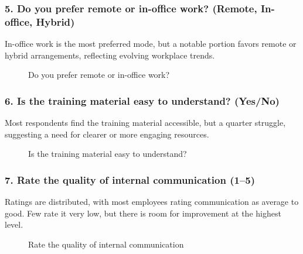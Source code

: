 \subsubsection*{5. Do you prefer remote or in-office work? (Remote, In-office, Hybrid)}

In-office work is the most preferred mode, but a notable portion favors remote or hybrid arrangements, reflecting evolving workplace trends.

\begin{figure}[H]
    \centering
    \caption{Do you prefer remote or in-office work?}
    \label{fig:work_pref}
\end{figure}

\subsubsection*{6. Is the training material easy to understand? (Yes/No)}

Most respondents find the training material accessible, but a quarter struggle, suggesting a need for clearer or more engaging resources.

\begin{figure}[H]
    \centering
    \caption{Is the training material easy to understand?}
    \label{fig:training_easy}
\end{figure}

\subsubsection*{7. Rate the quality of internal communication (1--5)}

Ratings are distributed, with most employees rating communication as average to good. Few rate it very low, but there is room for improvement at the highest level.

\begin{figure}[H]
    \centering
    \caption{Rate the quality of internal communication}
    \label{fig:comm_rating}
\end{figure}

